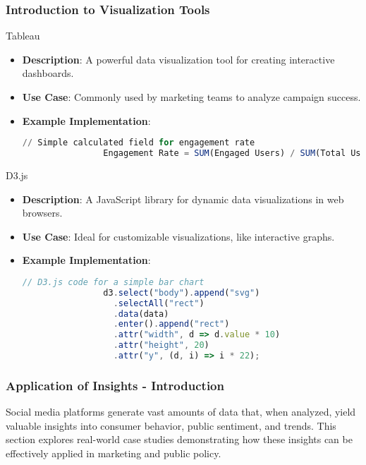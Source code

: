 \documentclass{beamer}
\begin{document}
\begin{frame}[fragile]
    \frametitle{Introduction to Visualization Tools}

    \begin{block}{Tableau}
        \begin{itemize}
            \item \textbf{Description}: A powerful data visualization tool for creating interactive dashboards.
            \item \textbf{Use Case}: Commonly used by marketing teams to analyze campaign success.
            \item \textbf{Example Implementation}:
            \begin{lstlisting}[language=SQL]
                // Simple calculated field for engagement rate
                Engagement Rate = SUM(Engaged Users) / SUM(Total Users)
            \end{lstlisting}
        \end{itemize}
    \end{block}

    \begin{block}{D3.js}
        \begin{itemize}
            \item \textbf{Description}: A JavaScript library for dynamic data visualizations in web browsers.
            \item \textbf{Use Case}: Ideal for customizable visualizations, like interactive graphs.
            \item \textbf{Example Implementation}:
            \begin{lstlisting}[language=JavaScript]
                // D3.js code for a simple bar chart
                d3.select("body").append("svg")
                  .selectAll("rect")
                  .data(data)
                  .enter().append("rect")
                  .attr("width", d => d.value * 10)
                  .attr("height", 20)
                  .attr("y", (d, i) => i * 22);
            \end{lstlisting}
        \end{itemize}
    \end{block}
\end{frame}

\begin{frame}[fragile]
    \frametitle{Application of Insights - Introduction}
    Social media platforms generate vast amounts of data that, when analyzed, yield valuable insights into consumer behavior, public sentiment, and trends. 
    This section explores real-world case studies demonstrating how these insights can be effectively applied in marketing and public policy.
\end{frame}
\end{document}
